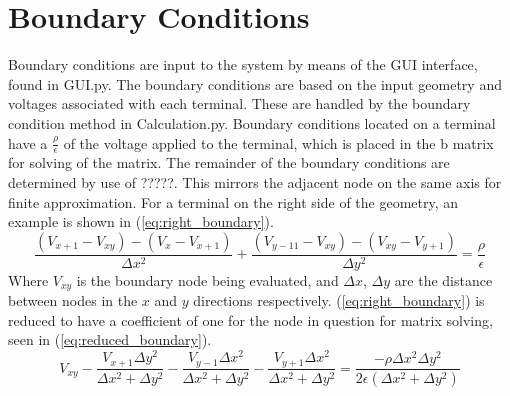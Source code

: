 \documentclass{article}[12pt]
\begin{document}
\section{Boundary Conditions}
	Boundary conditions are input to the system by means of the GUI interface, found in GUI.py. The boundary conditions are based on the input geometry and voltages associated with each terminal. These are handled by the boundary condition method in Calculation.py. Boundary conditions located on a terminal have a $\frac{\rho}{\epsilon}$ of the voltage applied to the terminal, which is placed in the b matrix for solving of the matrix. The remainder of the boundary conditions are determined by use of ?????. This mirrors the adjacent node on the same axis for finite approximation. For a terminal on the right side of the geometry, an example is shown in (\ref{eq:right_boundary}).
	\begin{equation}
		\frac{\left(V_{x+1}-V_{xy}\right)-\left(V_x-V_{x+1}\right)}{\Delta x^2}+\frac{\left(V_{y-11}-V_{xy}\right)-\left(V_{xy}-V_{y+1}\right)}{\Delta y^2}=\frac{\rho}{\epsilon}
		\label{eq:right_boundary}
	\end{equation}
Where $V_{xy}$ is the boundary node being evaluated, and $\Delta x$, $\Delta y$ are the distance between nodes in the $x$ and $y$ directions respectively. (\ref{eq:right_boundary}) is reduced to have a coefficient of one for the node in question for matrix solving, seen in (\ref{eq:reduced_boundary}).
	\begin{equation}
		V_{xy}-\frac{V_{x+1}\Delta y^2}{\Delta x^2+\Delta y^2}-\frac{V_{y-1}\Delta x^2}{\Delta  x^2+\Delta y^2}-\frac{V_{y+1}\Delta x^2}{\Delta  x^2+\Delta y^2}=\frac{-\rho \Delta  x^2 \Delta y^2}{2\epsilon\left(\Delta x^2+\Delta y^2\right)}
		\label{eq:reduced_boundary}
	\end{equation}
\end{document}
